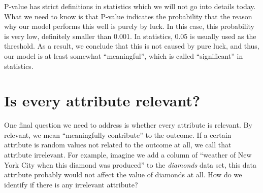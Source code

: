 \documentclass[
	letterpaper
]{article}
\begin{document}
P-value has strict definitions in statistics which we will not go into details today.
What we need to know is that P-value indicates the probability that the reason why our model performs this well is purely by luck.
In this case, this probability is very low, definitely smaller than 0.001.
In statistics, 0.05 is usually used as the threshold.
As a result, we conclude that this is not caused by pure luck, and thus, our model is at least somewhat ``meaningful'', which is called ``significant'' in statistics.

\section{Is every attribute relevant?}
One final question we need to address is whether every attribute is relevant.
By relevant, we mean ``meaningfully contribute'' to the outcome.
If a certain attribute is random values not related to the outcome at all, we call that attribute irrelevant.
For example, imagine we add a column of ``weather of New York City when this diamond was produced'' to the \textit{diamonds} data set, this data attribute probably would not affect the value of diamonds at all.
How do we identify if there is any irrelevant attribute?
\end{document}
